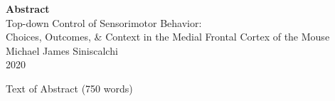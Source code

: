 
\begin{center}

\textbf{Abstract}\\

\bigskip
Top-down Control of Sensorimotor Behavior:\\ 
Choices, Outcomes, \& Context in the Medial Frontal Cortex of the Mouse\\

\bigskip
Michael James Siniscalchi\\
2020

\end{center}

\doublespacing
Text of Abstract (750 words)
\singlespacing